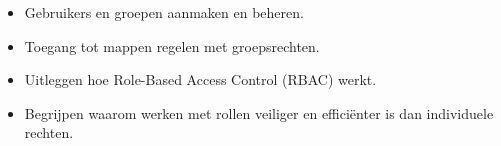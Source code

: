 \begin{itemize}
\item Gebruikers en groepen aanmaken en beheren.
\item Toegang tot mappen regelen met groepsrechten.
\item Uitleggen hoe Role-Based Access Control (RBAC) werkt.
\item Begrijpen waarom werken met rollen veiliger en effici\"enter is dan individuele rechten.
\end{itemize}

